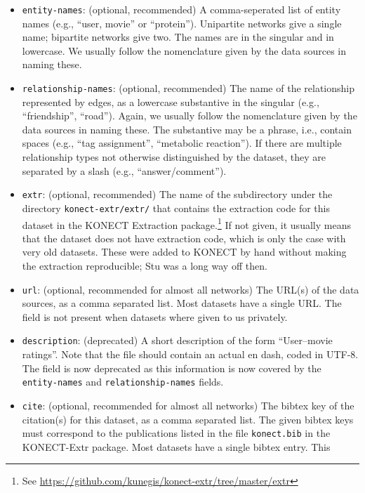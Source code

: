 \documentclass{article}
\begin{document}
\begin{itemize}
  may be shown insode a \texttt{<CODE>} tags. 
\item \texttt{entity-names}: (optional, recommended) A comma-seperated list of
  entity names (e.g., ``user, movie'' or ``protein'').  Unipartite networks give
  a single name; bipartite networks give two.
  The names are in the singular and in lowercase. 
  We usually follow the nomenclature given by the data sources in naming
  these. 
\item \texttt{relationship-names}: (optional, recommended) The name of the
  relationship represented by edges, as a lowercase substantive in the singular (e.g.,
  ``friendship'', ``road'').
  Again, we usually follow the nomenclature given by the data sources in naming
  these.  The substantive may be a phrase, i.e., contain spaces (e.g., 
  ``tag assignment'', ``metabolic reaction'').  If there are multiple
  relationship types not otherwise distinguished by the dataset, they  
  are separated by a slash (e.g., ``answer/comment'').
\item \texttt{extr}: (optional, recommended) The name of the
  subdirectory under the directory \texttt{konect-extr/extr/} that
  contains the extraction code for this dataset in the KONECT
  Extraction package.\footnote{See
    \href{https://github.com/kunegis/konect-extr/tree/master/extr}{https://github.com/kunegis/konect-extr/tree/master/extr}} 
  If not given, it usually means that the dataset does not have
  extraction code, which is only the case with very old datasets.  These
  were added to KONECT by hand without making the extraction
  reproducible; Stu was a long way off then. 
\item \texttt{url}: (optional, recommended for almost all networks) The
  URL(s) of the data sources, as a comma 
  separated list.  Most datasets have a single URL.  
  The field is not present when datasets where given to us privately. 
\item \texttt{description}: (deprecated) A short description of the form
  ``User–movie ratings''.  Note that the file should contain an
  actual en dash, coded in UTF-8.
  The field is now deprecated as this information is now covered by the
  \texttt{entity-names} and \texttt{relationship-names} fields. 
\item \texttt{cite}: (optional, recommended for almost all networks) The
  bibtex key of the citation(s) for this dataset, as a  
  comma separated list.  The given bibtex keys must correspond to the
  publications listed in the file \texttt{konect.bib} in the KONECT-Extr
  package. 
  Most datasets have a single bibtex entry.  This

\end{itemize}
\end{document}
